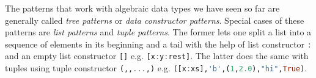 \documentclass[preprint]{sigplanconf}
\DeclareRobustCommand{\codehaskell}[1]{{\lstinline[breaklines=false,language=Haskell]{#1}}}
\begin{document}



%

The patterns that work with algebraic data types we have seen so far are 
generally called \emph{tree patterns} or \emph{data constructor patterns}. 
Special cases of these patterns are \emph{list patterns} and \emph{tuple 
patterns}. The former lets one split a list into a sequence of elements in its 
beginning and a tail with the help of list constructor \codehaskell{:} and an 
empty list constructor \codehaskell{[]} e.g. \codehaskell{[x:y:rest]}. The 
latter does the same with tuples using tuple constructor 
\codehaskell{(,,...,)} e.g. \codehaskell{([x:xs],'b',(1,2.0),"hi",True)}.
\end{document}
